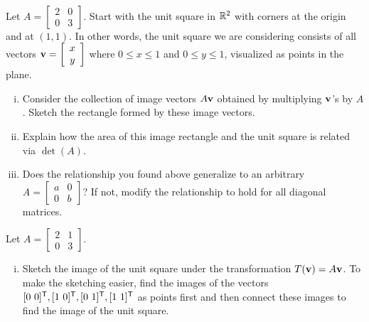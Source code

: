 \begin{activity} \label{act:4_f_3}~

\ba
\item Let $A = \left[ \begin{array}{cc} 2&0\\0&3 \end{array} \right]$. Start with the unit square in $\mathbb{R}^2$ with corners at the origin and at $(1,1)$. In other words, the unit square we are considering consists of all vectors $\mathbf{v}=\left[ \begin{array}{c} x\\y \end{array} \right]$ where $0\leq x\leq 1$ and $0\leq y\leq 1$, visualized as points in the plane. 

\begin{enumerate}[i.]
\item Consider the collection of image vectors $A\mathbf{v}$ obtained by multiplying $\mathbf{v}$'s by $A$. Sketch the rectangle formed by these image vectors. 



\item Explain how the area of this image rectangle and the unit square is related via $\det(A)$.



\item Does the relationship you found above generalize to an arbitrary $A = \left[ \begin{array}{cc} a&0\\0&b \end{array} \right]$? If not, modify the relationship to hold for all diagonal matrices.



\end{enumerate}

\item Let $A=\left[ \begin{array}{cc} 2&1\\ 0&3 \end{array} \right]$.

\begin{enumerate}[i.]
\item Sketch the image of the unit square under the transformation $T(\mathbf{v})=A\mathbf{v}$. To make the sketching easier, find the images of the vectors $[0 \  0]^{\mathsf{T}}, [1 \ 0]^{\mathsf{T}}, [0 \ 1]^{\mathsf{T}}, [1 \ 1]^{\mathsf{T}}$ as points first and then connect these images to find the image of the unit square.
	


\end{enumerate}
\end{activity}
